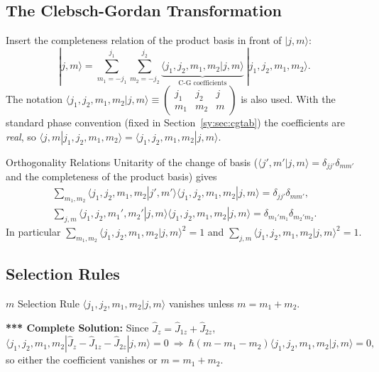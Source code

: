 \documentclass[11pt,a4paper]{article}
\begin{document}
\subsection{The Clebsch-Gordan Transformation}
Insert the completeness relation of the product basis in front of $|j,m\rangle$:
\[
|j,m\rangle=\sum_{m_1=-j_1}^{j_1}\sum_{m_2=-j_2}^{j_2}\underbrace{\langle j_1,j_2,m_1,m_2|j,m\rangle}_{\text{C-G coefficients}}\ |j_1,j_2,m_1,m_2\rangle .
\]
The notation $\langle j_1,j_2,m_1,m_2|j,m\rangle\equiv\begin{pmatrix}j_1&j_2&j\\m_1&m_2&m\end{pmatrix}$ is also used. With the standard phase convention (fixed in Section~\ref{sy:sec:cgtab}) the coefficients are \emph{real}, so $\langle j,m|j_1,j_2,m_1,m_2\rangle=\langle j_1,j_2,m_1,m_2|j,m\rangle$.

\begin{thm}{Orthogonality Relations}
Unitarity of the change of basis ($\langle j',m'|j,m\rangle=\delta_{jj'}\delta_{mm'}$ and the completeness of the product basis) gives
\begin{gather*}
\sum_{m_1,m_2}\langle j_1,j_2,m_1,m_2|j',m'\rangle\langle j_1,j_2,m_1,m_2|j,m\rangle=\delta_{jj'}\delta_{mm'},\\
\sum_{j,m}\langle j_1,j_2,m_1',m_2'|j,m\rangle\langle j_1,j_2,m_1,m_2|j,m\rangle=\delta_{m_1'm_1}\delta_{m_2'm_2}.
\end{gather*}
In particular $\displaystyle\sum_{m_1,m_2}\langle j_1,j_2,m_1,m_2|j,m\rangle^2=1$ and $\displaystyle\sum_{j,m}\langle j_1,j_2,m_1,m_2|j,m\rangle^2=1$.
\end{thm}

\subsection{Selection Rules}
\begin{thm}{$m$ Selection Rule}
$\langle j_1,j_2,m_1,m_2|j,m\rangle$ vanishes unless $m=m_1+m_2$.
\end{thm}
\textbf{*** Complete Solution:} Since $\hat J_z=\hat J_{1z}+\hat J_{2z}$,
\[
\langle j_1,j_2,m_1,m_2|\hat J_z-\hat J_{1z}-\hat J_{2z}|j,m\rangle=0\ \Rightarrow\ \hbar(m-m_1-m_2)\langle j_1,j_2,m_1,m_2|j,m\rangle=0 ,
\]
so either the coefficient vanishes or $m=m_1+m_2$.
\end{document}
